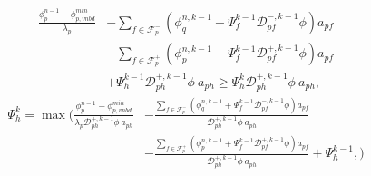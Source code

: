 \documentclass[../thesis.tex]{subfiles}
\begin{document}
\begin{equation*}
	\begin{split}
		\frac{\phi_p^{n-1} - \phi_{p,vnbd}^{min}}{\lambda_p}
		&- \sum_{f \in \mathcal{F}_p^-}
		\left( \phi_q^{n,k-1} + \Psi_{f}^{k-1} \mathcal{D}^{-,k-1}_{pf}\phi	\right) a_{pf}\\
		&- \sum_{f \in \mathcal{F}_p^+}
		\left( \phi_p^{n,k-1} + \Psi_{f}^{k-1} \mathcal{D}^{+,k-1}_{pf}\phi \right) a_{pf}\\
		&+ \Psi_{h}^{k-1} \mathcal{D}^{+,k-1}_{ph}\phi\ a_{ph}
		\geq
		\Psi_{h}^{k} \mathcal{D}^{+,k-1}_{ph}\phi\ a_{ph},
	\end{split}
\end{equation*}
\begin{equation*}
	\begin{split}
		\Psi_h^k = \max\Bigg(
			\frac{\phi_p^{n-1} - \phi_{p,vnbd}^{min}}
			{\lambda_p\mathcal{D}^{+,k-1}_{ph}\phi\ a_{ph}}
			&- \frac{\sum_{f \in \mathcal{F}_p^-}
			\left( \phi_q^{n,k-1} + \Psi_{f}^{k-1} \mathcal{D}^{-,k-1}_{pf}\phi	\right) a_{pf}}
			{\mathcal{D}^{+,k-1}_{ph}\phi\ a_{ph}}\\
			&- \frac{\sum_{f \in \mathcal{F}_p^+}
			\left( \phi_p^{n,k-1} + \Psi_{f}^{k-1} \mathcal{D}^{+,k-1}_{pf}\phi \right) a_{pf}}
			{\mathcal{D}^{+,k-1}_{ph}\phi\ a_{ph}} + \Psi_{h}^{k-1},
		\Bigg)
	\end{split}
\end{equation*}
\end{document}
